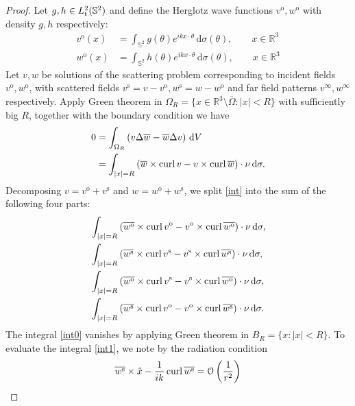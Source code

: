 \begin{proof}
  Let $g, h\in L_{\text t}^2(\mathbb{S}^2)$ and define the Herglotz wave functions $v^\text{o}, w^\text{o}$ with density $g, h$ respectively:
  \begin{align*}
    v^\text{o}(x) &= \int_{\mathbb{S}^2}g(\theta) e^{i k x\cdot\theta}\, \text{d}\sigma(\theta),\qquad x\in\mathbb{R}^3 \\
    w^\text{o}(x) &= \int_{\mathbb{S}^2}h(\theta) e^{i k x\cdot\theta}\, \text{d}\sigma(\theta),\qquad x\in\mathbb{R}^3 
  \end{align*}
  Let $v, w$ be solutions of the scattering problem corresponding to incident fields $v^\text{o}, w^\text{o}$, with scattered fields $v^\text{s}=v-v^\text{o}, w^\text{s}=w-w^\text{o}$ and far field patterns $v^\infty, w^\infty$ respectively. Apply Green theorem in $\Omega_R=\{x\in\mathbb{R}^3\setminus\overline{\Omega}: |x|<R\}$ with sufficiently big $R$, together with the boundary condition we have
  \begin{align}
    0 &= \int_{\Omega_R}\left(v\Delta\overline{w}-\overline{w}\Delta v\right)\,\text{d}V \\
    &= \int_{|x|=R}\left(\overline{w}\times\operatorname{curl}{v} - v\times\operatorname{curl}{\overline{w}}\right)\cdot\nu\,\text{d}\sigma.\label{int}
  \end{align} 
  Decomposing $v=v^\text{o}+v^\text{s}$ and $w=w^\text{o}+w^\text{s}$, we split \eqref{int} into the sum of the following four parts:
  \begin{align}
    &\int_{|x|=R}\left(\overline{w^\text{o}}\times\operatorname{curl}{v^\text{o}} - v^\text{o}\times\operatorname{curl}{\overline{w^\text{o}}}\right)\cdot\nu\,\text{d}\sigma,\label{int0} \\
    &\int_{|x|=R}\left(\overline{w^\text{s}}\times\operatorname{curl}{v^\text{s}} - v^\text{s}\times\operatorname{curl}{\overline{w^\text{s}}}\right)\cdot\nu\,\text{d}\sigma,\label{int1} \\
    &\int_{|x|=R}\left(\overline{w^\text{o}}\times\operatorname{curl}{v^\text{s}} - v^\text{s}\times\operatorname{curl}{\overline{w^\text{o}}}\right)\cdot\nu\,\text{d}\sigma,\label{int2} \\
    &\int_{|x|=R}\left(\overline{w^\text{s}}\times\operatorname{curl}{v^\text{o}} - v^\text{o}\times\operatorname{curl}{\overline{w^\text{s}}}\right)\cdot\nu\,\text{d}\sigma.\label{int3}
  \end{align}
  The integral \eqref{int0} vanishes by applying Green theorem in $B_R=\{x:|x|<R\}$. To evaluate the integral \eqref{int1}, we note by the radiation condition
  \begin{align}
    \overline{w^\text{s}}\times\hat{x} - \frac{1}{ik} \curl{\overline{w^\text{s}}} &= \mathcal{O}\left(\frac{1}{r^2}\right) \\

\end{align}
\end{proof}
